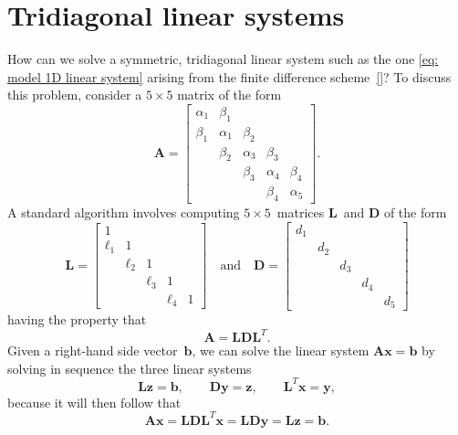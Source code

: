 \section{Tridiagonal linear systems}
How can we solve a symmetric, tridiagonal linear system such as the one
\eqref{eq: model 1D linear system} arising from the finite difference 
scheme~\eqref{}?  To discuss this problem, consider a $5\times5$ matrix of the 
form
\[
\boldsymbol{A}=\begin{bmatrix}
\alpha_1& \beta_1&        &        &\\
 \beta_1&\alpha_1& \beta_2&        &\\
        & \beta_2&\alpha_3&\beta_3 &\\
        &        & \beta_3&\alpha_4&\beta_4\\
        &        &        & \beta_4&\alpha_5
\end{bmatrix}.
\]
A standard algorithm involves computing $5\times5$~matrices 
$\boldsymbol{L}$~and $\boldsymbol{D}$ of the form
\[
\boldsymbol{L}=\begin{bmatrix}
     1&      &      &      &\\
\ell_1&     1&      &      &\\
      &\ell_2&     1&      &\\
      &      &\ell_3&     1&\\
      &      &      &\ell_4&1
  \end{bmatrix}
\quad\text{and}\quad
\boldsymbol{D}=\begin{bmatrix}
d_1&   &   &   &\\
   &d_2&   &   &\\
   &   &d_3&   &\\
   &   &   &d_4&\\
   &   &   &   &d_5
  \end{bmatrix}
\]
having the property that
\[
\boldsymbol{A}=\boldsymbol{L}\boldsymbol{D}\boldsymbol{L}^T.
\]
Given a right-hand side vector~$\boldsymbol{b}$, we can solve the linear system
$\boldsymbol{A}\boldsymbol{x}=\boldsymbol{b}$ by solving in sequence the three
linear systems
\begin{equation}\label{eq: LDLT systems}
\boldsymbol{L}\boldsymbol{z}=\boldsymbol{b},\qquad
\boldsymbol{D}\boldsymbol{y}=\boldsymbol{z},\qquad
\boldsymbol{L}^T\boldsymbol{x}=\boldsymbol{y},
\end{equation}
because it will then follow that
\[
\boldsymbol{A}\boldsymbol{x}
    =\boldsymbol{L}\boldsymbol{D}\boldsymbol{L}^T\boldsymbol{x}
    =\boldsymbol{L}\boldsymbol{D}\boldsymbol{y}
    =\boldsymbol{L}\boldsymbol{z}=\boldsymbol{b}.
\]
